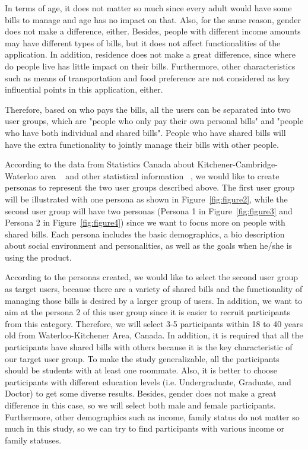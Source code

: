 \documentclass{sigchi}
\begin{document}
 In terms of age, it does not matter so much since every adult would have some bills to manage and age has no impact on that. Also, for the same reason, gender does not make a difference, either. Besides, people with different income amounts may have different types of bills, but it does not affect functionalities of the application. In addition, residence does not make a great difference, since where do people live has little impact on their bills. Furthermore, other characteristics such as means of transportation and food preference are not considered as key influential points in this application, either. 
 

 Therefore, based on who pays the bills, all the users can be separated into two user groups, which are "people who only pay their own personal bills" and "people who have both individual and shared bills". People who have shared bills will have the extra functionality to jointly manage their bills with other people.
 
 
According to the data from Statistics Canada about Kitchener-Cambridge-Waterloo area ~\cite{ECP} and other statistical information ~\cite{FHSC}, we would like to create personas to represent the two user groups described above. The first user group will be illustrated with one persona as shown in Figure~\ref{fig:figure2}, while the second user group will have two personas (Persona 1 in Figure~\ref{fig:figure3} and Persona 2 in Figure~\ref{fig:figure4}) since we want to focus more on people with shared bills. Each persona includes the basic demographics, a bio description about social environment and personalities, as well as the goals when he/she is using the product.

According to the personas created, we would like to select the second user group as target users, because there are a variety of shared bills and the functionality of managing those bills is desired by a larger group of users. In addition, we want to aim at the persona 2 of this user group since it is easier to recruit participants from this category. Therefore, we will select 3-5 participants within 18 to 40 years old from Waterloo-Kitchener Area, Canada. In addition, it is required that all the participants have shared bills with others because it is the key characteristic of our target user group. To make the study generalizable, all the participants should be students with at least one roommate. Also, it is better to choose participants with different education levels (i.e. Undergraduate, Graduate, and Doctor) to get some diverse results. Besides, gender does not make a great difference in this case, so we will select both male and female participants. Furthermore, other demographics such as income, family status do not matter so much in this study, so we can try to find participants with various income or family statuses.
\end{document}
